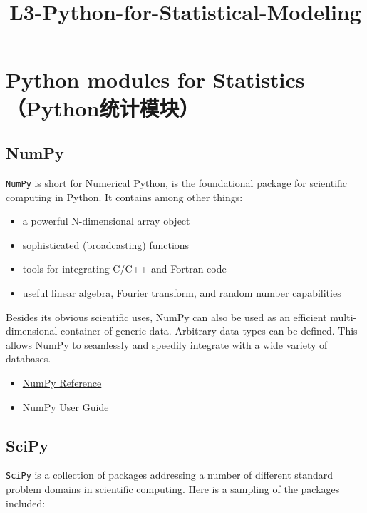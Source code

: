 \documentclass{article}
\title{L3-Python-for-Statistical-Modeling}
\begin{document}
    
    
    \maketitle
    
    

    
    \section{Python modules for Statistics
（Python统计模块）}\label{python-modules-for-statistics-pythonux7edfux8ba1ux6a21ux5757}

\subsection{NumPy}\label{numpy}

\texttt{NumPy} is short for Numerical Python, is the foundational
package for scientific computing in Python. It contains among other
things:

\begin{itemize}
\itemsep1pt\parskip0pt
\item
  a powerful N-dimensional array object
\item
  sophisticated (broadcasting) functions
\item
  tools for integrating C/C++ and Fortran code
\item
  useful linear algebra, Fourier transform, and random number
  capabilities
\end{itemize}

Besides its obvious scientific uses, NumPy can also be used as an
efficient multi-dimensional container of generic data. Arbitrary
data-types can be defined. This allows NumPy to seamlessly and speedily
integrate with a wide variety of databases.

\begin{itemize}
\itemsep1pt\parskip0pt
\item
  \href{http://docs.scipy.org/doc/numpy/reference/}{NumPy Reference}
\item
  \href{http://docs.scipy.org/doc/numpy/user/index.html}{NumPy User
  Guide}
\end{itemize}

\subsection{SciPy}\label{scipy}

\texttt{SciPy} is a collection of packages addressing a number of
different standard problem domains in scientific computing. Here is a
sampling of the packages included:
\end{document}
